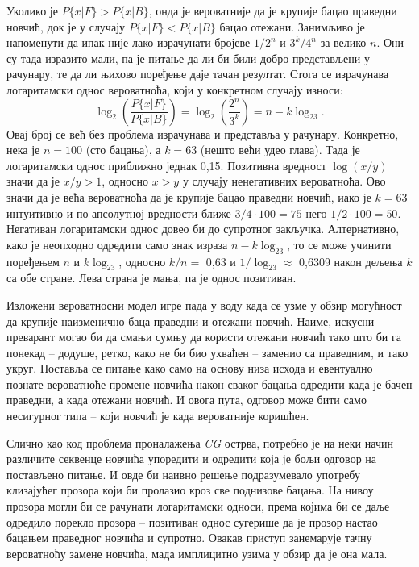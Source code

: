 \documentclass[12pt,oneside]{memoir}
\begin{document}
\begin{CJK}{UTF8}{ipxm}
Уколико је $P\{x | F\} > P\{x | B\}$, онда је вероватније да је крупије бацао праведни новчић, док је у случају $P\{x | F\} < P\{x | B\}$ бацао отежани. Занимљиво је напоменути да ипак није лако израчунати бројеве $1/2^n$ и $3^k/4^n$ за велико $n$. Они су тада изразито мали, па је питање да ли би били добро представљени у рачунару, те да ли њихово поређење даје тачан резултат. Стога се израчунава логаритамски однос вероватноћа, који у конкретном случају износи: $$\log_2\left(\frac{P\{x | F\}}{P\{x | B\}}\right) = \log_2\left(\frac{2^n}{3^k}\right) = n - k\log_23.$$ Овај број се већ без проблема израчунава и представља у рачунару. Конкретно, нека је $n = 100$ (сто бацања), а $k = 63$ (нешто већи удео глава). Тада је логаритамски однос приближно једнак 0,15. Позитивна вредност $\log(x/y)$ значи да је $x/y > 1$, односно $x > y$ у случају ненегативних вероватноћа. Ово значи да је већа вероватноћа да је крупије бацао праведни новчић, иако је $k = 63$ интуитивно и по апсолутној вредности ближе $3/4 \cdot 100 = 75$ него $1/2 \cdot 100 = 50$. Негативан логаритамски однос довео би до супротног закључка. Алтернативно, како је неопходно одредити само знак израза $n - k\log_23$, то се може учинити поређењем $n$ и $k\log_23$, односно $k/n =$ 0,63 и $1/\log_23 \approx$ 0,6309 након дељења $k$ са обе стране. Лева страна је мања, па је однос позитиван.

Изложени вероватносни модел игре пада у воду када се узме у обзир могућност да крупије наизменично баца праведни и отежани новчић. Наиме, искусни преварант могао би да смањи сумњу да користи отежани новчић тако што би га понекад -- додуше, ретко, како не би био ухваћен -- заменио са праведним, и тако укруг. Поставља се питање како само на основу низа исхода и евентуално познате вероватноће промене новчића након сваког бацања одредити када је бачен праведни, а када отежани новчић. И овога пута, одговор може бити само несигурног типа -- који новчић је када вероватније коришћен.

Слично као код проблема проналажења \textit{CG} острва, потребно је на неки начин различите секвенце новчића упоредити и одредити која је бољи одговор на постављено питање. И овде би наивно решење подразумевало употребу клизајућег прозора који би пролазио кроз све поднизове бацања. На нивоу прозора могли би се рачунати логаритамски односи, према којима би се даље одредило порекло прозора -- позитиван однос сугерише да је прозор настао бацањем праведног новчића и супротно. Овакав приступ занемарује тачну вероватноћу замене новчића, мада имплицитно узима у обзир да је она мала.


\end{CJK}
\end{document}
